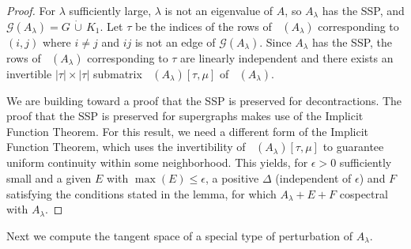 \documentclass[11pt]{article}
\theoremstyle{definition}
\theoremstyle{definition}
\theoremstyle{definition}
\DeclareMathOperator{\TS}{TS_S}
\newcommand{\dcup}{\,\dot{\cup}\,}
\newcommand{\x}{\times}
\newcommand{\lam}{\lambda}
\newcommand{\G}{\mathcal{G}}
\begin{document}
\begin{proof}
For $\lambda $ sufficiently large,  $\lambda$ is not an eigenvalue of $A$, so $A_{\lambda}$ has the SSP, and  $\G(A_{\lambda})=G\dcup K_1$. 
Let $\tau$ be the indices of the rows of $\TS(A_{\lambda})$ corresponding to 
$(i,j)$ where $i\neq j$ and $ij$ is not an edge of $\G(A_{\lambda})$.
Since $A_{\lambda}$ has the SSP, the rows of $\TS(A_{\lambda})$ corresponding to $\tau$ are linearly independent
and  there exists  an  invertible $|\tau|\x |\tau|$ submatrix $\TS(A_{\lambda})[\tau, \mu]$ of  $\TS(A_{\lambda})$.  

We are building toward a proof that the SSP is preserved for decontractions.  The proof that the SSP is preserved for supergraphs \cite[Theorem~10]{genSAP} makes use of the Implicit Function Theorem.  For this result, we need a different form of the Implicit Function Theorem, which uses the invertibility of $\TS(A_{\lambda})[\tau, \mu]$ to guarantee uniform continuity within some neighborhood.  This yields, for $\epsilon>0$ sufficiently small and a given $E$ with $\max(E)\leq\epsilon$, a positive $\Delta$ (independent of $\epsilon$) and $F$ satisfying the conditions stated in the lemma, for which $A_\lambda+E+F$ cospectral with $A_\lambda$.
\end{proof}



Next we compute the tangent space of a special type of perturbation of $A_{\lambda}$. 
\end{document}
